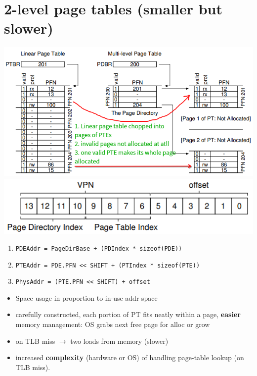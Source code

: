 \section*{2-level page tables (smaller but slower)}
\includegraphics[width=\linewidth]{imgs/multi_level_pt}
\includegraphics[width=\linewidth]{imgs/two_level_pt}
\begin{enumerate}
\item \texttt{PDEAddr = PageDirBase + (PDIndex * sizeof(PDE))}
\item \texttt{PTEAddr = PDE.PFN << SHIFT + (PTIndex * sizeof(PTE))}
\item \texttt{PhysAddr = (PTE.PFN << SHIFT) + offset}
\end{enumerate}
\begin{minipage}{.5\linewidth}
  \flushleft
  \begin{itemize}
  \item Space usage in proportion to in-use addr space
  \item carefully constructed, each portion of PT fits neatly within a page, \textbf{easier} memory management: OS grabs next free page for alloc or grow
  \end{itemize}
\end{minipage}
\begin{minipage}{.5\linewidth}
  \flushleft
  \begin{itemize}
  \item on TLB miss $\to$ two loads from memory (slower)
  \item increased \textbf{complexity} (hardware or OS) of handling page-table lookup (on TLB miss).
  \end{itemize}
\end{minipage}

